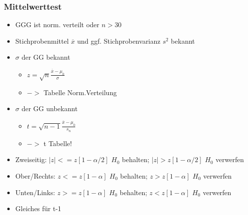 \documentclass[a4paper]{article}
\begin{document}
\begin{landscape}
\begin{multicols}{4}
        \subsubsection*{Mittelwerttest}
        \begin{itemize}[noitemsep,nolistsep,leftmargin=*]
            \item GGG ist norm. verteilt oder $n > 30$
            \item Stichprobenmittel $\overline{x}$ und ggf. Stichprobenvarianz $s^2$ bekannt
            \item $\sigma$ der GG bekannt
            \begin{itemize}[noitemsep,nolistsep,leftmargin=*]
                \item $z = \sqrt{n}\frac{\overline{x}-\mu_0}{\sigma}$
                \item $->$ Tabelle Norm.Verteilung
            \end{itemize}
            \item $\sigma$ der GG unbekannt
            \begin{itemize}[noitemsep,nolistsep,leftmargin=*]
                \item $t = \sqrt{n-1}\frac{\overline{x}-\mu_0}{s_n}$
                \item $->$ t Tabelle!
            \end{itemize}
            \item Zweiseitig: $|z| <= z[1-\alpha/2]$ $H_0$ behalten; $|z| > z[1-\alpha/2]$ $H_0$ verwerfen
            \item Ober/Rechts: $z <= z[1-\alpha]$ $H_0$ behalten; $z > z[1-\alpha]$ $H_0$ verwerfen
            \item Unten/Links: $z >= z[1-\alpha]$ $H_0$ behalten; $z < z[1-\alpha]$ $H_0$ verwerfen
            \item Gleiches für t-1
        \end{itemize}

\end{multicols}
\end{landscape}
\end{document}
